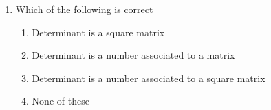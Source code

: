 \begin{enumerate}[resume]
\begin{enumerate}[label=(\roman*)]
\item $k \abs{A}$
\item $k^2 \abs{A}$
\item $k^3 \abs{A}$
\item $3k \abs{A}$
\end{enumerate}
\item Which of the following is correct 
\begin{enumerate}
\item Determinant is a square matrix
\item Determinant is a number associated to a matrix
\item Determinant is a number associated to a square matrix
\item None of these
\end{enumerate}
\end{enumerate}
